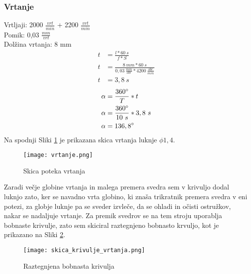 \subsubsection{Vrtanje}
Vrtljaji: 2000 \( \frac{vrt}{min} \) + 2200 \( \frac{vrt}{min} \)\\
Pomik: 0,03 \( \frac{mm}{vrt} \) \\
Dolžina vrtanja: 8 mm
\begin{equation}
	\begin{split}
		t &= \frac{l*60\ s}{f*S} \\
		t &= \frac{8\ mm*60\ s}{0,03\ \frac{mm}{obr}*4200\ \frac{obr}{min}} \\
		t &= 3,8\ s
	\end{split}
\end{equation}
\begin{equation}
	\begin{split}
		\alpha &= \frac{360\degree}{T} * t \\
		\alpha &= \frac{360\degree}{10\ s} * 3,8\ s\\
		\alpha &= 136,8\degree
	\end{split}
\end{equation}
Na spodnji Sliki \ref{vrtanje} je prikazana skica vrtanja
luknje $\phi 1,4$.
\begin{figure}[H]
	\begin{center}
		\texttt{[image: vrtanje.png]}
		\caption{Skica poteka vrtanja
			\cite{lasten}}
		\label{vrtanje}
	\end{center}
\end{figure}
Zaradi večje globine vrtanja in malega premera svedra
sem v krivuljo dodal luknjo zato, ker se navadno vrta globino, ki znaša trikratnik
premera svedra v eni potezi, za globje luknje pa se sveder
izvleče, da se ohladi in očisti ostružkov, nakar se nadaljuje vrtanje.
Za premik svedrov se na tem stroju uporablja bobnaste krivulje,
zato sem skiciral raztegnjeno bobnasto krvuljo, kot je prikazano
na Sliki \ref{raztegnjen_boben}.
\begin{figure}[H]
	\begin{center}
		\texttt{[image: skica\_krivulje\_vrtanja.png]}
		\caption{Raztegnjena bobnasta krivulja
			\cite{lasten}}
		\label{raztegnjen_boben}
	\end{center}
\end{figure}
